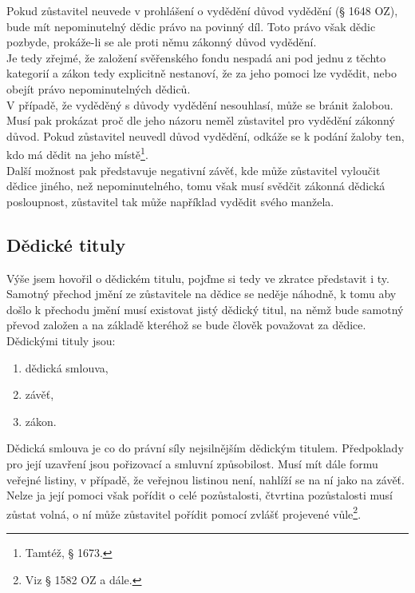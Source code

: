 \documentclass{article}
\begin{document}
Pokud zůstavitel neuvede v prohlášení o vydědění důvod vydědění (§ 1648 OZ), bude mít nepominutelný dědic právo na povinný díl. Toto právo však dědic pozbyde, prokáže-li se ale proti němu zákonný důvod vydědění.\\

Je tedy zřejmé, že založení svěřenského fondu nespadá ani pod jednu z těchto kategorií a zákon tedy explicitně nestanoví, že za jeho pomoci lze vydědit, nebo obejít právo nepominutelných dědiců.\\

V případě, že vyděděný s důvody vydědění nesouhlasí, může se bránit žalobou. Musí pak prokázat proč dle jeho názoru neměl zůstavitel pro vydědění zákonný důvod. Pokud zůstavitel neuvedl důvod vydědění, odkáže se k podání žaloby ten, kdo má dědit na jeho místě\footnote{Tamtéž, § 1673.}.\\

Další možnost pak představuje negativní závěť, kde může zůstavitel vyloučit dědice jiného, než nepominutelného, tomu však musí svědčit zákonná dědická posloupnost, zůstavitel tak může například vydědit svého manžela.

\subsection{Dědické tituly}

Výše jsem hovořil o dědickém titulu, pojďme si tedy ve zkratce představit i ty. \\

Samotný přechod jmění ze zůstavitele na dědice se neděje náhodně, k tomu aby došlo k přechodu jmění musí existovat jistý dědický titul, na němž bude samotný převod založen a na základě kteréhož se bude člověk považovat za dědice.\\

Dědickými tituly jsou:

\begin{enumerate}
\item dědická smlouva,
\item závěť,
\item zákon.	
\end{enumerate}

Dědická smlouva je co do právní síly nejsilnějším dědickým titulem. Předpoklady pro její uzavření jsou pořizovací a smluvní způsobilost. Musí mít dále formu veřejné listiny, v případě, že veřejnou listinou není, nahlíží se na ní jako na závěť. Nelze ja její pomoci však pořídit o celé pozůstalosti, čtvrtina pozůstalosti musí zůstat volná, o ní může zůstavitel pořídit pomocí zvlášť projevené vůle\footnote{Viz § 1582 OZ a dále.}.\\
\end{document}
